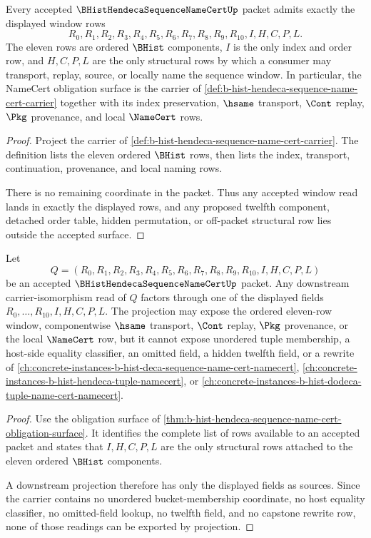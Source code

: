 \begin{theorem}
\label{thm:b-hist-hendeca-sequence-name-cert-obligation-surface}
Every accepted $\BHistHendecaSequenceNameCertUp$ packet admits exactly the displayed window rows
$$
R_0,R_1,R_2,R_3,R_4,R_5,R_6,R_7,R_8,R_9,R_{10},I,H,C,P,L.
$$
The eleven rows are ordered $\BHist$ components, $I$ is the only index and order row, and $H,C,P,L$ are the only structural rows by which a consumer may transport, replay, source, or locally name the sequence window. In particular, the NameCert obligation surface is the carrier of \autoref{def:b-hist-hendeca-sequence-name-cert-carrier} together with its index preservation, $\hsame$ transport, $\Cont$ replay, $\Pkg$ provenance, and local $\NameCert$ rows.
\end{theorem}
\begin{proof}
Project the carrier of \autoref{def:b-hist-hendeca-sequence-name-cert-carrier}. The definition lists the eleven ordered $\BHist$ rows, then lists the index, transport, continuation, provenance, and local naming rows.

There is no remaining coordinate in the packet. Thus any accepted window read lands in exactly the displayed rows, and any proposed twelfth component, detached order table, hidden permutation, or off-packet structural row lies outside the accepted surface.
\end{proof}

\begin{theorem}
\label{thm:b-hist-hendeca-sequence-name-cert-field-projection}
Let
$$
Q=(R_0,R_1,R_2,R_3,R_4,R_5,R_6,R_7,R_8,R_9,R_{10},I,H,C,P,L)
$$
be an accepted $\BHistHendecaSequenceNameCertUp$ packet. Any downstream carrier-isomorphism read of $Q$ factors through one of the displayed fields $R_0,\ldots,R_{10},I,H,C,P,L$. The projection may expose the ordered eleven-row window, componentwise $\hsame$ transport, $\Cont$ replay, $\Pkg$ provenance, or the local $\NameCert$ row, but it cannot expose unordered tuple membership, a host-side equality classifier, an omitted field, a hidden twelfth field, or a rewrite of \autoref{ch:concrete-instances-b-hist-deca-sequence-name-cert-namecert}, \autoref{ch:concrete-instances-b-hist-hendeca-tuple-namecert}, or \autoref{ch:concrete-instances-b-hist-dodeca-tuple-name-cert-namecert}.
\end{theorem}
\begin{proof}
Use the obligation surface of \autoref{thm:b-hist-hendeca-sequence-name-cert-obligation-surface}. It identifies the complete list of rows available to an accepted packet and states that $I,H,C,P,L$ are the only structural rows attached to the eleven ordered $\BHist$ components.

A downstream projection therefore has only the displayed fields as sources. Since the carrier contains no unordered bucket-membership coordinate, no host equality classifier, no omitted-field lookup, no twelfth field, and no capstone rewrite row, none of those readings can be exported by projection.
\end{proof}

